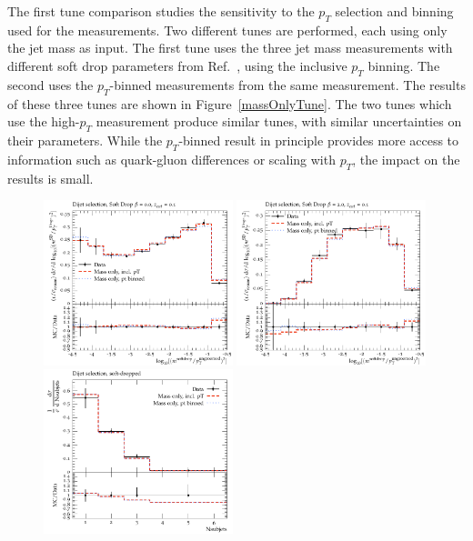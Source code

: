 The first tune comparison studies the sensitivity to the $p_T$ selection and binning used for the measurements. Two different tunes are performed, each using only the jet mass as input.
The first tune uses the three jet mass measurements with different soft drop parameters from Ref.~\cite{Aaboud:2017qwh}, using the inclusive $p_T$ binning. 
The second uses the $p_T$-binned measurements from the same measurement. 
The results of these three tunes are shown in Figure~\ref{massOnlyTune}. 
The two tunes which use the high-$p_T$ measurement produce similar tunes, with similar uncertainties on their parameters. 
While the $p_T$-binned result in principle provides more access to information such as quark-gluon differences or scaling with $p_T$, the impact on the results is small. 


\begin{figure}
\begin{center}
\includegraphics[width=0.49\textwidth]{figs/RivetPlotsMassOnly/SoftDropMass/d01-x01-y01.pdf} \hfill
\includegraphics[width=0.49\textwidth]{figs/RivetPlotsMassOnly/SoftDropMass/d03-x01-y01.pdf} \hfill
\includegraphics[width=0.49\textwidth]{figs/RivetPlotsMassOnly/ATLAS_2019_I1724098/d23-x01-y01.pdf} \hfill

\end{center}
\end{figure}
